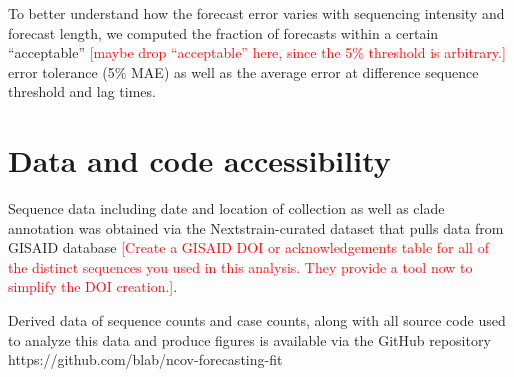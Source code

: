 \documentclass[11pt,oneside,letterpaper]{article}
\def\jhc#1{\textcolor{red}{[#1]}}
\begin{document}
To better understand how the forecast error varies with sequencing intensity and forecast length, we computed the fraction of forecasts within a certain ``acceptable'' \jhc{maybe drop ``acceptable'' here, since the 5\% threshold is arbitrary.} error tolerance (5\% MAE) as well as the average error at difference sequence threshold and lag times.


\section*{Data and code accessibility}

Sequence data including date and location of collection as well as clade annotation was obtained via the Nextstrain-curated
dataset that pulls data from GISAID database \jhc{Create a GISAID DOI or acknowledgements table for all of the distinct sequences you used in this analysis. They provide a tool now to simplify the DOI creation.}.


Derived data of sequence counts and case counts, along with all source code used to analyze
this data and produce figures is available via the GitHub repository https://github.com/blab/ncov-forecasting-fit




\end{document}
